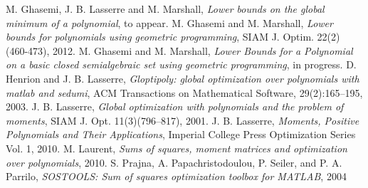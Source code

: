 \documentclass{amsart}
\theoremstyle{definition}
\begin{document}
\begin{thebibliography}{20}
	 M. Ghasemi, J. B. Lasserre and M. Marshall, \emph{Lower bounds on the global minimum of a polynomial}, to appear.
	 M. Ghasemi and M. Marshall, \emph{Lower bounds for polynomials using geometric programming}, SIAM J. Optim. 22(2) (460-473), 
	2012.
	 M. Ghasemi and M. Marshall, \emph{Lower Bounds for a Polynomial on a basic closed semialgebraic set using geometric 
	programming}, in progress.
	 D. Henrion and J. B. Lasserre, \emph{Gloptipoly: global optimization over polynomials with
	matlab and sedumi}, ACM Transactions on Mathematical Software, 29(2):165–195, 2003.
	 J. B. Lasserre, \emph{Global optimization with polynomials and the problem of moments}, SIAM J. Opt. 11(3)(796–817), 2001.
	 J. B. Lasserre, \emph{Moments, Positive Polynomials and Their Applications}, Imperial College Press Optimization Series 
	Vol. 1, 2010.
	 M. Laurent, \emph{Sums of squares, moment matrices and optimization over polynomials}, 2010.
	 S. Prajna, A. Papachristodoulou, P. Seiler, and P. A. Parrilo, \emph{SOSTOOLS: Sum of squares optimization toolbox for 
	MATLAB}, 2004
\end{thebibliography}
\end{document}

